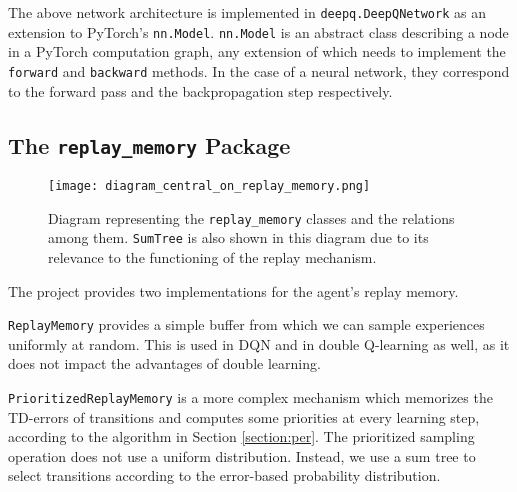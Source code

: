 The above network architecture is implemented in \texttt{deepq.DeepQNetwork} as an extension to PyTorch’s \texttt{nn.Model}.
\texttt{nn.Model} is an abstract class describing a node in a PyTorch computation graph, any extension of which needs to implement the \texttt{forward} and \texttt{backward} methods.
In the case of a neural network, they correspond to the forward pass and the backpropagation step respectively.

\subsection{The \texttt{replay\_memory} Package} \label{section:replay-memory-implementation}

\begin{figure}[ht]
    \centering
    \texttt{[image: diagram\_central\_on\_replay\_memory.png]}
    \caption{Diagram representing the \texttt{replay\_memory} classes and the relations among them.
    \texttt{SumTree} is also shown in this diagram due to its relevance to the functioning of the replay mechanism.}
\end{figure}

The project provides two implementations for the agent’s replay memory.

\texttt{ReplayMemory} provides a simple buffer from which we can sample experiences uniformly at random. This is used in DQN and in double Q-learning as well, as it does not impact the advantages of double learning.

\texttt{PrioritizedReplayMemory} is a more complex mechanism which memorizes the TD-errors of transitions and computes some priorities at every learning step, according to the algorithm in Section \ref{section:per}.
The prioritized sampling operation does not use a uniform distribution.
Instead, we use a sum tree to select transitions according to the error-based probability distribution.

